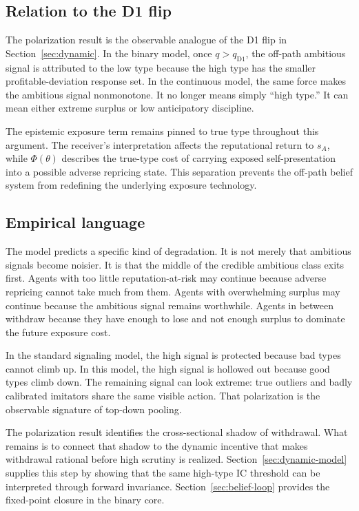 
\InsertPolarizationVarianceFigure

\subsection{Relation to the D1 flip}

The polarization result is the observable analogue of the D1 flip in Section~\ref{sec:dynamic}. In the binary model, once \(q>q_{\mathrm{D1}}\), the off-path ambitious signal is attributed to the low type because the high type has the smaller profitable-deviation response set. In the continuous model, the same force makes the ambitious signal nonmonotone. It no longer means simply ``high type.'' It can mean either extreme surplus or low anticipatory discipline.

The epistemic exposure term remains pinned to true type throughout this argument. The receiver's interpretation affects the reputational return to \(s_A\), while \(\Phi(\theta)\) describes the true-type cost of carrying exposed self-presentation into a possible adverse repricing state. This separation prevents the off-path belief system from redefining the underlying exposure technology.

\subsection{Empirical language}

The model predicts a specific kind of degradation. It is not merely that ambitious signals become noisier. It is that the middle of the credible ambitious class exits first. Agents with too little reputation-at-risk may continue because adverse repricing cannot take much from them. Agents with overwhelming surplus may continue because the ambitious signal remains worthwhile. Agents in between withdraw because they have enough to lose and not enough surplus to dominate the future exposure cost.

In the standard signaling model, the high signal is protected because bad types cannot climb up. In this model, the high signal is hollowed out because good types climb down. The remaining signal can look extreme: true outliers and badly calibrated imitators share the same visible action. That polarization is the observable signature of top-down pooling.

The polarization result identifies the cross-sectional shadow of withdrawal. What remains is to connect that shadow to the dynamic incentive that makes withdrawal rational before high scrutiny is realized. Section~\ref{sec:dynamic-model} supplies this step by showing that the same high-type IC threshold can be interpreted through forward invariance. Section~\ref{sec:belief-loop} provides the fixed-point closure in the binary core.
